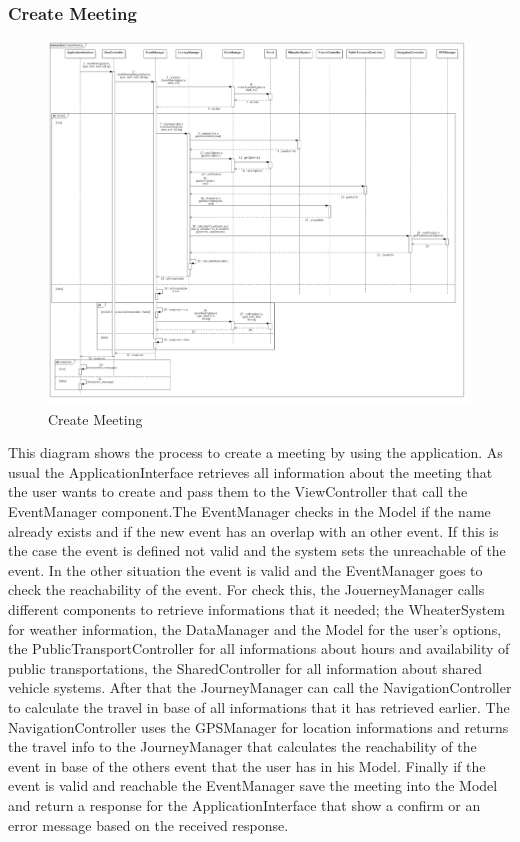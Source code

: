 \subsubsection{Create Meeting}
\begin{figure}[H]
\centering
\includegraphics[scale=0.25]{images/CreateMeeting}
\caption{Create Meeting}
\end{figure}This diagram shows the process to create a meeting by using the application. As usual the ApplicationInterface retrieves all information about the meeting that the user wants to create and pass them to the ViewController that call the EventManager component.The EventManager checks in the Model if the name already exists and if the new event has an overlap with an other event. If this is the case the event is defined not valid and the system sets the unreachable of the event. In the other situation the event is valid and the EventManager goes to check the reachability of the event. For check this, the JouerneyManager calls different components to retrieve informations that it needed; the WheaterSystem for weather information, the DataManager and the Model for the user’s options, the PublicTransportController for all informations about hours and availability of public transportations, the SharedController for all information about shared vehicle systems. After that the JourneyManager can call the NavigationController to calculate the travel in base of all informations that it has retrieved earlier. The NavigationController uses the GPSManager for location informations and returns the travel info to the JourneyManager that calculates the reachability of the event in base of the others event that the user has in his Model. Finally if the event is valid and reachable the EventManager save the meeting into the Model and return a response for the ApplicationInterface that show a confirm or an error message based on the received response.

